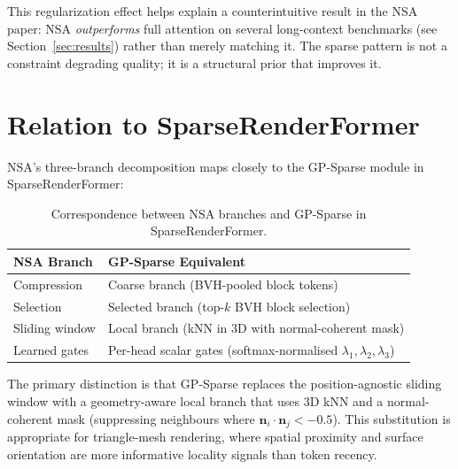 \documentclass[11pt,letterpaper]{article}
\begin{document}
This regularization effect helps explain a counterintuitive result in the NSA paper: NSA
\emph{outperforms} full attention on several long-context benchmarks (see Section~\ref{sec:results})
rather than merely matching it.
The sparse pattern is not a constraint degrading quality; it is a structural prior that
improves it.

\section{Relation to SparseRenderFormer}

NSA's three-branch decomposition maps closely to the GP-Sparse module in SparseRenderFormer:

\begin{table}[h]
\centering
\begin{tabularx}{\textwidth}{lX}
\toprule
\textbf{NSA Branch} & \textbf{GP-Sparse Equivalent} \\
\midrule
Compression   & Coarse branch (BVH-pooled block tokens) \\
Selection     & Selected branch (top-$k$ BVH block selection) \\
Sliding window & Local branch (kNN in 3D with normal-coherent mask) \\
Learned gates & Per-head scalar gates (softmax-normalised $\lambda_1, \lambda_2, \lambda_3$) \\
\bottomrule
\end{tabularx}
\caption{Correspondence between NSA branches and GP-Sparse in SparseRenderFormer.}
\end{table}

The primary distinction is that GP-Sparse replaces the position-agnostic sliding window with a
geometry-aware local branch that uses 3D kNN and a normal-coherent mask (suppressing neighbours
where $\mathbf{n}_i \cdot \mathbf{n}_j < -0.5$). This substitution is appropriate for
triangle-mesh rendering, where spatial proximity and surface orientation are more informative
locality signals than token recency.
\end{document}
